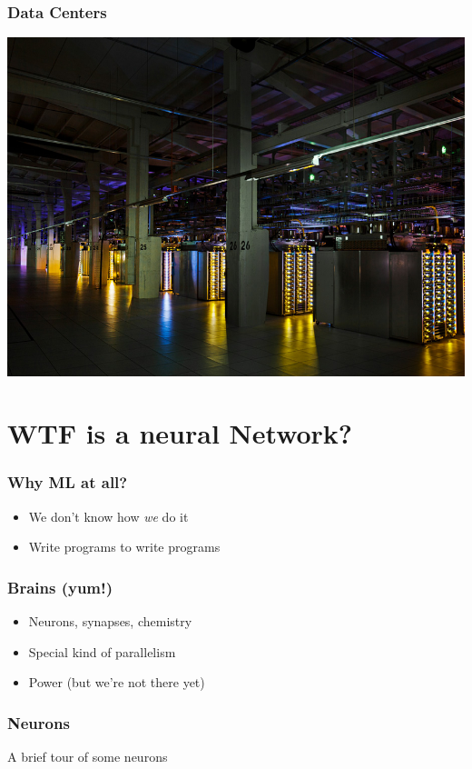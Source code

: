 \begin{frame}
  \frametitle{Data Centers}
  \includegraphics[width=.9\textwidth]{google-dc.png}

\end{frame}

\section{WTF is a neural Network?}

\begin{frame}
  \frametitle{Why ML at all?}
  \begin{itemize}
  \item We don't know how \textit{we} do it
  \item Write programs to write programs
  \end{itemize}
\end{frame}

\begin{frame}
  \frametitle{Brains (yum!)}
  \begin{itemize}
  \item Neurons, synapses, chemistry
  \item Special kind of parallelism
  \item Power (but we're not there yet)
  \end{itemize}
\end{frame}

\begin{frame}
  \frametitle{Neurons}
  \vspace{2cm}
  \centerline{\huge A brief tour of some neurons}
\end{frame}

